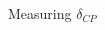 \begin{frame}{Measuring $\delta_{CP}$}
\begin{columns}[T]
\begin{column}{0.50\textwidth}
\begin{center}
    \end{center}
  \end{column}
\end{columns}

\end{frame}


%
%
%

%
%
%
%
%
%
%
%
%
%
%

%
%
%

